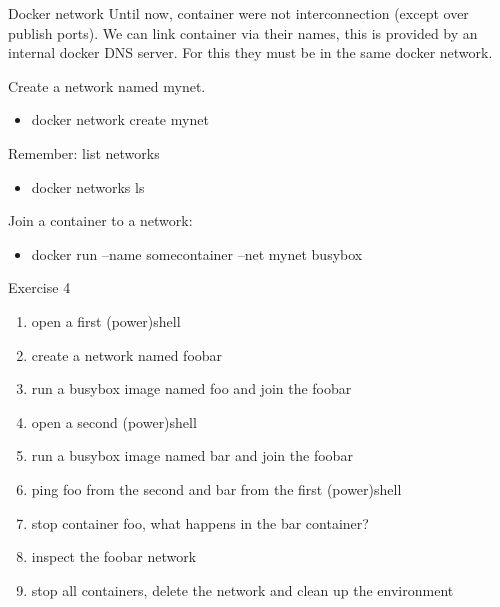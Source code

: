 \documentclass[10pt,aspectratio=\ratio,
compress
]{beamer}
\begin{document}

\begin{frame}{Docker network}
Until now, container were not interconnection (except over publish ports).
We can link container via their names, this is provided by an internal docker DNS server.
For this they must be in the same docker network.

Create a network named mynet.
\begin{itemize}
	\item docker network create mynet
\end{itemize}
Remember: list networks
\begin{itemize}
	\item docker networks ls
\end{itemize}

Join a container to a network:
\begin{itemize}
	\item docker run --name somecontainer --net mynet busybox
\end{itemize}

\end{frame}

\begin{frame}{Exercise 4}
\begin{enumerate}
	\item open a first (power)shell
	\item create a network named foobar
	\item run a busybox image named foo and join the foobar
	\item open a second (power)shell
	\item run a busybox image named bar and join the foobar
	\item ping foo from the second and bar from the first (power)shell
	\item stop container foo, what happens in the bar container?
	\item inspect the foobar network
	\item stop all containers, delete the network and clean up the environment
	
\end{enumerate}
\end{frame}
\end{document}
